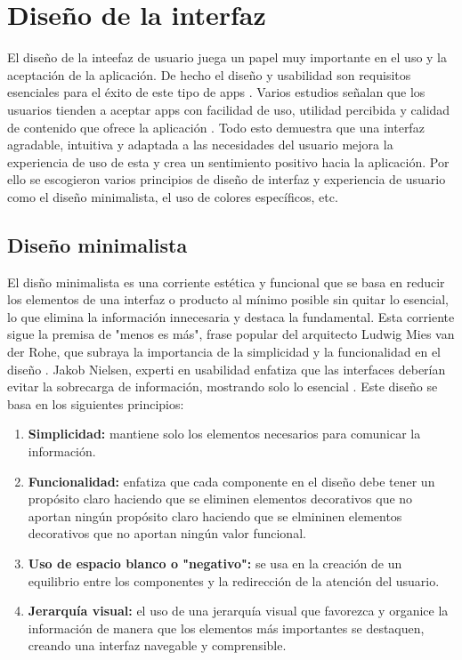 \documentclass[twoside, openright, 11pt]{report}
\begin{document}
	
	
	  
	
	\section{Diseño de la interfaz}
		El diseño de la inteefaz de usuario juega un papel muy importante en el uso y la aceptación de la aplicación. De hecho el diseño y usabilidad son requisitos esenciales para el éxito de este tipo de apps \cite{liew2019usability}. Varios estudios señalan que los usuarios tienden a aceptar apps con facilidad de uso, utilidad percibida y calidad de contenido que ofrece la aplicación \cite{Lim2025CuestionarioUsabilidad}. Todo esto demuestra que una interfaz agradable, intuitiva y adaptada a las necesidades del usuario mejora la experiencia de uso de esta y crea un sentimiento positivo hacia la aplicación. Por ello se escogieron varios principios de diseño de interfaz y experiencia de usuario como el diseño minimalista, el uso de colores específicos, etc.
		
		\subsection{Diseño minimalista}
		El disño minimalista es una corriente estética y funcional que se basa en reducir los elementos de una interfaz o producto al mínimo posible sin quitar lo esencial, lo que elimina la información innecesaria y destaca la fundamental. Esta corriente sigue la premisa de "menos es más", frase popular del arquitecto Ludwig Mies van der Rohe, que subraya la importancia de la simplicidad y la funcionalidad en el diseño \cite{wikipediaLessIsMore}. Jakob Nielsen, experti en usabilidad enfatiza que las interfaces deberían evitar la sobrecarga de información, mostrando solo lo esencial \cite{nielsen1994}. Este diseño se basa en los siguientes principios:
		\begin{enumerate}
			\item \textbf{Simplicidad:} mantiene solo los elementos necesarios para comunicar la información.
			\item \textbf{Funcionalidad:} enfatiza que cada componente en el diseño debe tener un propósito claro haciendo que se eliminen elementos decorativos que no aportan ningún propósito claro haciendo que se elmininen elementos decorativos que no aportan ningún valor funcional.
			\item \textbf{Uso de espacio blanco o "negativo":} se usa en la creación de un equilibrio entre los componentes y la redirección de la atención del usuario.
			\item \textbf{Jerarquía visual:} el uso de una jerarquía visual que favorezca y organice la información de manera que los elementos más importantes se destaquen, creando una interfaz navegable y comprensible.
		\end{enumerate}
\end{document}
